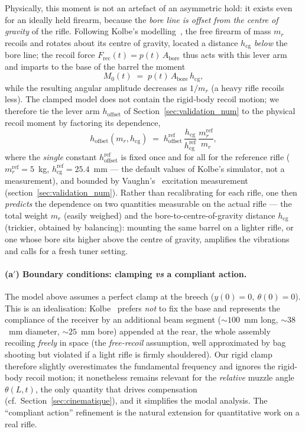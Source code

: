 \documentclass[12pt,a4paper]{article}
\begin{document}
	Physically, this moment is not an artefact of an asymmetric hold: it exists even for an ideally held firearm, because the \emph{bore line is offset from the centre of gravity} of the rifle. Following Kolbe's modelling~\cite{KolbeSim}, the free firearm of mass $m_r$ recoils and rotates about its centre of gravity, located a distance $h_\text{cg}$ \emph{below} the bore line; the recoil force $F_\text{rec}(t) = p(t)\,A_\text{bore}$ thus acts with this lever arm and imparts to the base of the barrel the moment
	\begin{equation}
		\label{eq:moment_recul}
		M_0(t) \;=\; p(t)\,A_\text{bore}\,h_\text{cg},
	\end{equation}
	while the resulting angular amplitude decreases as $1/m_r$ (a heavy rifle recoils less). The clamped model does not contain the rigid-body recoil motion; we therefore tie the lever arm $h_\text{offset}$ of Section~\ref{sec:validation_num} to the physical recoil moment by factoring its dependence,
	\begin{equation}
		\label{eq:hoffset_phys}
		h_\text{offset}(m_r, h_\text{cg}) \;=\; h_\text{offset}^\text{ref}\,\frac{h_\text{cg}}{h_\text{cg}^\text{ref}}\,\frac{m_r^\text{ref}}{m_r},
	\end{equation}
	where the \emph{single} constant $h_\text{offset}^\text{ref}$ is fixed once and for all for the reference rifle ($m_r^\text{ref} = 5$~kg, $h_\text{cg}^\text{ref} = 25.4$~mm --- the default values of Kolbe's simulator, not a measurement), and bounded by Vaughn's~\cite{Vaughn} excitation measurement (section~\ref{sec:validation_num}). Rather than recalibrating for each rifle, one then \emph{predicts} the dependence on two quantities measurable on the actual rifle --- the total weight $m_r$ (easily weighed) and the bore-to-centre-of-gravity distance $h_\text{cg}$ (trickier, obtained by balancing): mounting the same barrel on a lighter rifle, or one whose bore sits higher above the centre of gravity, amplifies the vibrations and calls for a fresh tuner setting.

	\paragraph{(a$'$) Boundary conditions: clamping \emph{vs} a compliant action.} The model above assumes a perfect clamp at the breech ($y(0)=0,\ \theta(0)=0$). This is an idealisation: Kolbe~\cite{KolbeSim} prefers \emph{not} to fix the base and represents the compliance of the receiver by an additional beam segment ($\sim 100$~mm long, $\sim 38$~mm diameter, $\sim 25$~mm bore) appended at the rear, the whole assembly recoiling \emph{freely} in space (the \emph{free-recoil} assumption, well approximated by bag shooting but violated if a light rifle is firmly shouldered). Our rigid clamp therefore slightly overestimates the fundamental frequency and ignores the rigid-body recoil motion; it nonetheless remains relevant for the \emph{relative} muzzle angle $\theta(L,t)$, the only quantity that drives compensation (cf.\ Section~\ref{sec:cinematique}), and it simplifies the modal analysis. The ``compliant action'' refinement is the natural extension for quantitative work on a real rifle.
\end{document}
